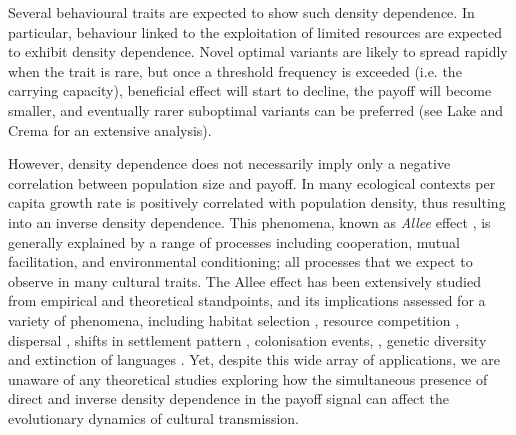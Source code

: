 \documentclass[review,authoryear]{elsarticle}
\begin{document}
Several behavioural traits are expected to show such density dependence. In particular, behaviour linked to the exploitation of limited resources are expected to exhibit density dependence. Novel optimal variants are likely to spread rapidly when the trait is rare, but once a threshold frequency is exceeded (i.e. the carrying capacity),  beneficial effect will start to decline, the payoff will become smaller, and eventually rarer suboptimal variants can be preferred (see Lake and Crema \citeyear{lake_and_crema_2012} for an extensive analysis). 

However, density dependence does not necessarily imply only a negative correlation between population size and payoff. In many ecological contexts per capita growth rate is positively correlated with population density, thus resulting into an inverse density dependence. This phenomena, known as \emph{Allee} effect \citep{allee1958,courchamp_etal_1999}, is generally explained by a range of processes including cooperation, mutual facilitation, and environmental conditioning; all processes that we expect to observe  in many cultural traits. The Allee effect has been extensively studied  from  empirical and theoretical standpoints, and its implications assessed for a variety of phenomena, including habitat selection \citep{greene_and_stamps_2001}, resource competition \citep{jang2013},  dispersal \citep{steele_2009}, shifts in settlement pattern \citep{crema_2014}, colonisation events,  \citep{kennet_etal_2006}, genetic diversity \citep{roques_etal_2012} and extinction of languages \citep{sutherland_2003} . Yet, despite this wide array of applications, we are unaware of any theoretical studies exploring how the simultaneous presence of direct and inverse density dependence in the payoff signal can affect the evolutionary dynamics of cultural transmission.   
\end{document}
